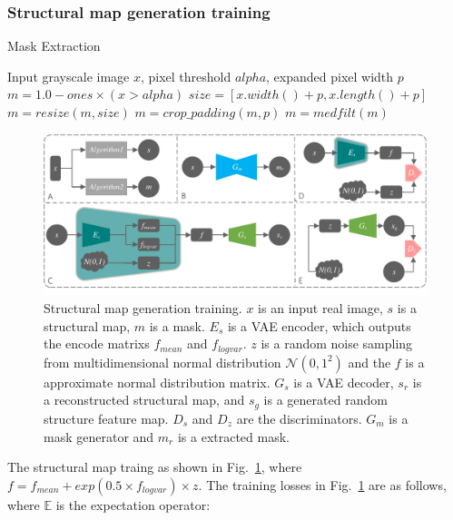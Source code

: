 \documentclass[runningheads]{llncs}
\begin{document}
	\subsubsection{Structural map generation training}
	\begin{algorithm}
		\caption{Mask Extraction}
		\label{alg:2}
		\begin{multicols}{2}
			\begin{algorithmic}[1]
				\State Input grayscale image $x$,  pixel threshold $alpha$, expanded pixel width $p$
				\State $m = 1.0 - ones \times (x > alpha)$
				\State $size=[x.width()+p, x.length()+p]$
				\State $m = resize(m, size)$
				\State $m = crop\_padding(m,p)$
				\State $m = medfilt(m)$
			\end{algorithmic}  
		\end{multicols}
	\end{algorithm}
	\begin{figure}
		\centering
		\includegraphics[width=0.98\columnwidth]{figures/feature_train}
		\caption{Structural map generation training. $x$ is an input real image, $s$ is a structural map, $m$ is a mask. $E_s$ is a VAE encoder, which outputs the encode matrixs $f_{mean}$ and $f_{logvar}$. $z$ is a random noise sampling from multidimensional normal distribution $\mathcal{N}(0,1^2)$ and the $f$ is a approximate normal distribution matrix. $G_s$ is a VAE decoder, $s_r$ is a reconstructed structural map, and $s_g$ is a generated random structure feature map. $D_{s}$ and $D_{z}$ are the discriminators. $G_m$ is a mask generator and $m_r$ is a extracted mask. }
		\label{feature_train}
	\end{figure}
	The structural map traing as shown in Fig.~\ref{feature_train}, where $f=f_{mean}+exp(0.5\times f_{logvar})\times z$. The training losses in Fig.~\ref{feature_train} are as follows, where $\mathbb{E}$ is the expectation operator: 
\end{document}
